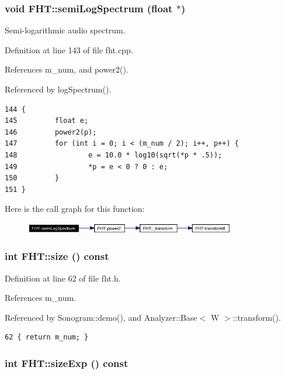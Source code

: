 \subsubsection{\setlength{\rightskip}{0pt plus 5cm}void FHT::semi\-Log\-Spectrum (float $\ast$)}\label{classFHT_FHTa10}


Semi-logarithmic audio spectrum.

Definition at line 143 of file fht.cpp.

References m\_\-num, and power2().

Referenced by log\-Spectrum().



\footnotesize\begin{verbatim}144 {
145         float e;
146         power2(p);
147         for (int i = 0; i < (m_num / 2); i++, p++) {
148                 e = 10.0 * log10(sqrt(*p * .5));
149                 *p = e < 0 ? 0 : e;
150         }
151 }
\end{verbatim}\normalsize 


Here is the call graph for this function:\begin{figure}[H]
\begin{center}
\leavevmode
\includegraphics[width=260pt]{classFHT_FHTa10_cgraph}
\end{center}
\end{figure}
\subsubsection{\setlength{\rightskip}{0pt plus 5cm}int FHT::size () const\hspace{0.3cm}{\tt  [inline]}}\label{classFHT_FHTa3}




Definition at line 62 of file fht.h.

References m\_\-num.

Referenced by Sonogram::demo(), and Analyzer::Base$<$ W $>$::transform().



\footnotesize\begin{verbatim}62 { return m_num; }
\end{verbatim}\normalsize 
{}
\subsubsection{\setlength{\rightskip}{0pt plus 5cm}int FHT::size\-Exp () const\hspace{0.3cm}{\tt  [inline]}}\label{classFHT_FHTa2}




